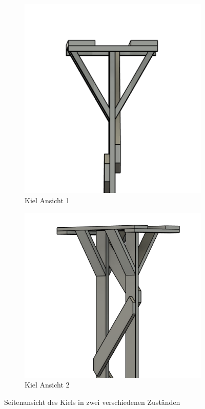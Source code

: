 \begin{figure}[H]
    \centering
    \begin{subfigure}[b]{0.48\linewidth}
        \centering
        \includegraphics[width=\linewidth]{assets/kiel_side1.png}
        \caption{Kiel Ansicht 1}
        \label{fig:kiel_side1}
    \end{subfigure}
    \hfill
    \begin{subfigure}[b]{0.48\linewidth}
        \centering
        \includegraphics[width=\linewidth]{assets/kiel_side2.png}
        \caption{Kiel Ansicht 2}
        \label{fig:kiel_side2}
    \end{subfigure}
    \caption{Seitenansicht des Kiels in zwei verschiedenen Zuständen}
    \label{fig:kiel_side_views}
\end{figure}



